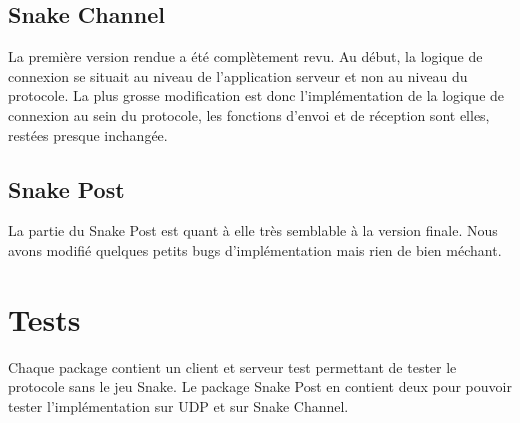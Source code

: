 \documentclass[a4paper]{article}
\begin{document}
\subsection{Snake Channel}
La première version rendue a été complètement revu.
Au début, la logique de connexion se situait au niveau de l'application serveur et non au niveau du protocole.
La plus grosse modification est donc l'implémentation de la logique de connexion au sein du protocole, les fonctions d'envoi et de réception sont elles, restées presque inchangée.
\subsection{Snake Post}
La partie du Snake Post est quant à elle très semblable à la version finale. Nous avons modifié quelques petits bugs d'implémentation mais rien de bien méchant.

\section{Tests}
Chaque package contient un client et serveur test permettant de tester le protocole sans le jeu Snake.
Le package Snake Post en contient deux pour pouvoir tester l'implémentation sur UDP et sur Snake Channel.
\end{document}
